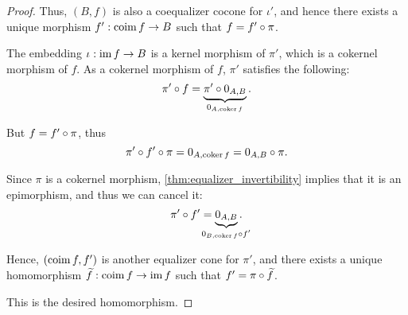\begin{proof}
  Thus, \( (B, f) \) is also a coequalizer cocone for \( \iota' \), and hence there exists a unique morphism \( f': \operatorname*{co\negthinspace\operatorname{im}} f \to B \) such that \( f = f' \bincirc \pi \).

   The embedding \( \iota: \operatorname{im} f \to B \) is a kernel morphism of \( \pi' \), which is a cokernel morphism of \( f \). As a cokernel morphism of \( f \), \( \pi' \) satisfies the following:
  \begin{equation*}
    \pi' \bincirc f = \underbrace{\pi' \bincirc 0_{A,B}}_{0_{A,\co\ker f}}.
  \end{equation*}

  But \( f = f' \bincirc \pi \), thus
  \begin{equation*}
    \pi' \bincirc f' \bincirc \pi = 0_{A,\co\ker f} = 0_{A,B} \bincirc \pi.
  \end{equation*}

  Since \( \pi \) is a cokernel morphism, \cref{thm:equalizer_invertibility} implies that it is an epimorphism, and thus we can cancel it:
  \begin{equation*}
    \pi' \bincirc f' = \underbrace{0_{A,B}}_{\mathclap{0_{B,\co\ker f} \bincirc f'}}.
  \end{equation*}

  Hence, \( (\operatorname*{co\negthinspace\operatorname{im}} f, f') \) is another equalizer cone for \( \pi' \), and there exists a unique homomorphism \( \widetilde{f}: \operatorname*{co\negthinspace\operatorname{im}} f \to \operatorname{im} f \) such that \( f' = \pi \bincirc \widetilde{f} \).

  This is the desired homomorphism.
\end{proof}


